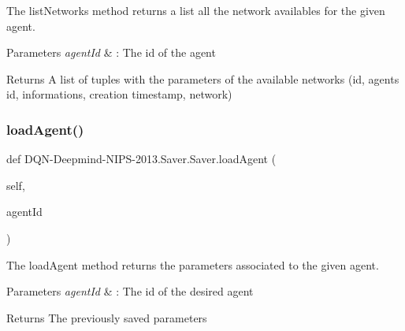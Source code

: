 The list\+Networks method returns a list all the network availables for the given agent. 


\begin{DoxyParams}{Parameters}
{\em agent\+Id} & \+: The id of the agent\\
\hline
\end{DoxyParams}
\begin{DoxyReturn}{Returns}
A list of tuples with the parameters of the available networks (id, agent\textquotesingle{}s id, informations, creation timestamp, network) 
\end{DoxyReturn}
\hypertarget{classDQN-Deepmind-NIPS-2013_1_1Saver_1_1Saver_aaf903c7b667b1909a17beb60c13f2398}{}\label{classDQN-Deepmind-NIPS-2013_1_1Saver_1_1Saver_aaf903c7b667b1909a17beb60c13f2398} 
\subsubsection{\texorpdfstring{load\+Agent()}{loadAgent()}}
{\footnotesize\ttfamily def D\+QN-\/Deepmind-\/N\+I\+PS-\/2013.Saver.\+Saver.\+load\+Agent (\begin{DoxyParamCaption}\item[{}]{self,  }\item[{}]{agent\+Id }\end{DoxyParamCaption})}



The load\+Agent method returns the parameters associated to the given agent. 


\begin{DoxyParams}{Parameters}
{\em agent\+Id} & \+: The id of the desired agent\\
\hline
\end{DoxyParams}
\begin{DoxyReturn}{Returns}
The previously saved parameters 
\end{DoxyReturn}
\hypertarget{classDQN-Deepmind-NIPS-2013_1_1Saver_1_1Saver_a76d60329698faf415c4ed0dae362f53e}{}\label{classDQN-Deepmind-NIPS-2013_1_1Saver_1_1Saver_a76d60329698faf415c4ed0dae362f53e} 
